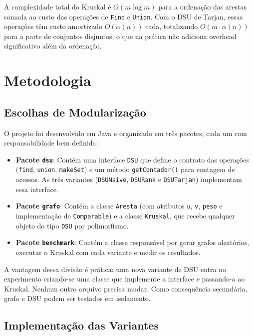 \documentclass[12pt]{article}
\begin{document}
A complexidade total do Kruskal é $O(m \log m)$ para a ordenação das arestas somada ao custo das operações de \texttt{Find} e \texttt{Union}. Com o DSU de Tarjan, essas operações têm custo amortizado $O(\alpha(n))$ cada, totalizando $O(m \cdot \alpha(n))$ para a parte de conjuntos disjuntos, o que na prática não adiciona overhead significativo além da ordenação.


\section{Metodologia}
\label{sec:metodologia}

\subsection{Escolhas de Modularização}

O projeto foi desenvolvido em Java e organizado em três pacotes, cada um com responsabilidade bem definida:

\begin{itemize}
  \item \textbf{Pacote \texttt{dsu}}: Contém uma interface \texttt{DSU} que define o contrato das operações (\texttt{find}, \texttt{union}, \texttt{makeSet}) e um método \texttt{getContador()} para contagem de acessos. As três variantes (\texttt{DSUNaive}, \texttt{DSURank} e \texttt{DSUTarjan}) implementam essa interface.

  \item \textbf{Pacote \texttt{grafo}}: Contém a classe \texttt{Aresta} (com atributos \texttt{u}, \texttt{v}, \texttt{peso} e implementação de \texttt{Comparable}) e a classe \texttt{Kruskal}, que recebe qualquer objeto do tipo \texttt{DSU} por polimorfismo.

  \item \textbf{Pacote \texttt{benchmark}}: Contém a classe responsável por gerar grafos aleatórios, executar o Kruskal com cada variante e medir os resultados.
\end{itemize}

A vantagem dessa divisão é prática: uma nova variante de DSU entra no experimento criando-se uma classe que implemente a interface e passando-a ao Kruskal. Nenhum outro arquivo precisa mudar. Como consequência secundária, grafo e DSU podem ser testados em isolamento.

\subsection{Implementação das Variantes}
\end{document}
